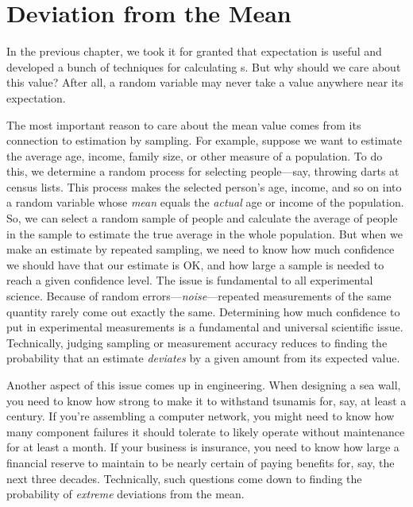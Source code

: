 \chapter{Deviation from the Mean}\label{deviation_chap}


In the previous chapter, we took it for granted that expectation is
useful and developed a bunch of techniques for calculating
s.  But why should we care about this value?
After all, a random variable may never take a value anywhere near its
expectation.

The most important reason to care about the mean value comes from its
connection to estimation by sampling.  For example, suppose we want to
estimate the average age, income, family size, or other measure of a
population.  To do this, we determine a random process for selecting
people---say, throwing darts at census lists.  This process makes the
selected person's age, income, and so on into a random variable whose
\emph{mean} equals the \emph{actual } age or income of
the population.  So, we can select a random sample of people and
calculate the average of people in the sample to estimate the true
average in the whole population.  But when we make an estimate by
repeated sampling, we need to know how much confidence we should have
that our estimate is OK, and how large a sample is needed to reach a
given confidence level.  The issue is fundamental to all experimental
science.  Because of random errors---\emph{noise}---repeated
measurements of the same quantity rarely come out exactly the same.
Determining how much confidence to put in experimental measurements is
a fundamental and universal scientific issue.  Technically, judging
sampling or measurement accuracy reduces to finding the probability
that an estimate \emph{deviates} by a given amount from its expected
value.

Another aspect of this issue comes up in engineering.  When designing
a sea wall, you need to know how strong to make it to withstand
tsunamis for, say, at least a century.  If you're assembling a
computer network, you might need to know how many component failures it
should tolerate to likely operate without maintenance for at
least a month.  If your business is insurance, you need to know how
large a financial reserve to maintain to be nearly certain of paying
benefits for, say, the next three decades.  Technically, such
questions come down to finding the probability of \emph{extreme}
deviations from the mean.

